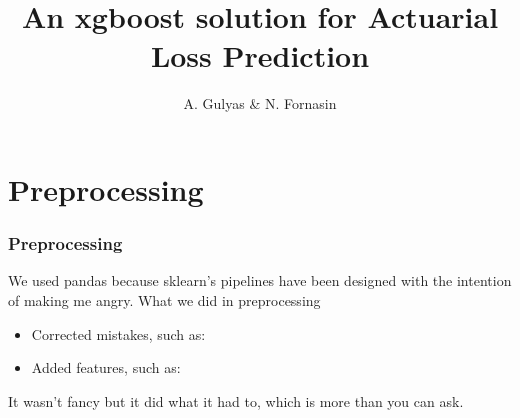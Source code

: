 \documentclass{beamer}
\title{An xgboost solution for Actuarial Loss Prediction} %
\author{A. Gulyas \& N. Fornasin} %
\institute[ALU] %
{
Team Boosted Goose\\ %
\medskip
}
\date{\quad} %
\begin{document}
\begin{frame}
\titlepage %
\end{frame}






\section{Preprocessing}
\begin{frame}
\frametitle{Preprocessing}
We used pandas because sklearn's pipelines have been designed with the intention of making me angry. What we did in preprocessing
\begin{itemize}
\item Corrected mistakes, such as:
\item Added features, such as:
\end{itemize}
It wasn't fancy but it did what it had to, which is more than you can ask.
\end{frame}
\end{document}
